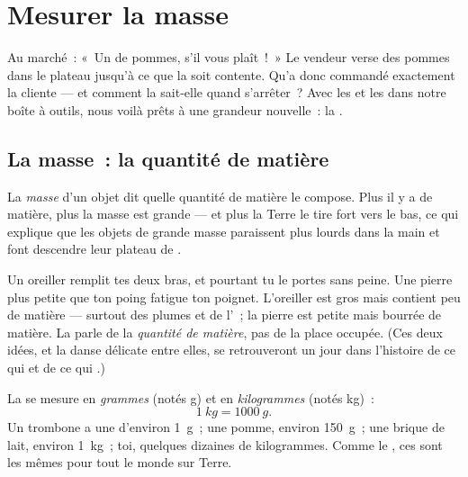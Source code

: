 \chapter{Mesurer la masse}\label{ch:g3:measuring-mass}

Au marché~: «~Un  de pommes, s'il vous plaît~!~» Le vendeur
verse des pommes dans le plateau jusqu'à ce que la  soit
contente. Qu'a donc commandé exactement la cliente --- et comment la
 sait-elle quand s'arrêter~? Avec les  et les 
dans notre boîte à outils, nous voilà prêts à  une grandeur
nouvelle~: la .

\section{La masse~: la quantité de matière}

\begin{definition}[Masse]\label{def:g3:measuring-mass:mass}
La \emph{masse} d'un objet dit quelle quantité de
matière le compose. Plus il y a de matière, plus la masse est
grande --- et plus la Terre le tire fort vers le bas, ce qui explique
que les objets de grande masse paraissent plus lourds dans la main et
font descendre leur plateau de .
\end{definition}

\begin{example}\label{ex:g3:measuring-mass:bignotcheavy}
Un oreiller remplit tes deux bras, et pourtant tu le portes sans
peine. Une pierre plus petite que ton poing fatigue ton poignet.
L'oreiller est gros mais contient peu de matière --- surtout des
plumes et de l'~; la pierre est petite mais bourrée de matière. La
 parle de la \emph{quantité de matière}, pas de la place
occupée. (Ces deux idées, et la danse délicate entre elles, se
retrouveront un jour dans l'histoire de ce qui  et de ce qui
.)
\end{example}

\begin{definition}\label{def:g3:measuring-mass:units}
La  se mesure en \emph{grammes} (notés \unit{g})
et en \emph{kilogrammes} (notés \unit{kg})~:
\[
\qty{1}{kg} = \qty{1000}{g}.
\]
Un trombone a une  d'environ \qty{1}{g}~; une pomme, environ
\qty{150}{g}~; une brique de lait, environ \qty{1}{kg}~; toi,
quelques dizaines de kilogrammes. Comme le , ces  sont les
mêmes pour tout le monde sur Terre.
\end{definition}


